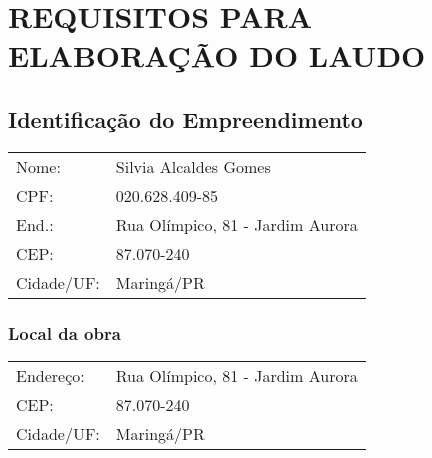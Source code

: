 \chapter{REQUISITOS PARA ELABORAÇÃO DO LAUDO}

\section{Identificação do Empreendimento}

\begin{tabular}{ll}
Nome: & Silvia Alcaldes Gomes\\
CPF: & 020.628.409-85\\
End.: &Rua Olímpico, 81 - Jardim Aurora\\
CEP:  & 87.070-240\\
Cidade/UF:  & Maringá/PR\\
\end{tabular}


\subsection*{Local da obra}

\begin{tabularx}{\textwidth}{lX}
Endereço:  & Rua Olímpico, 81 - Jardim Aurora\\
CEP:  & 87.070-240\\
Cidade/UF:  & Maringá/PR \\
\end{tabularx}

